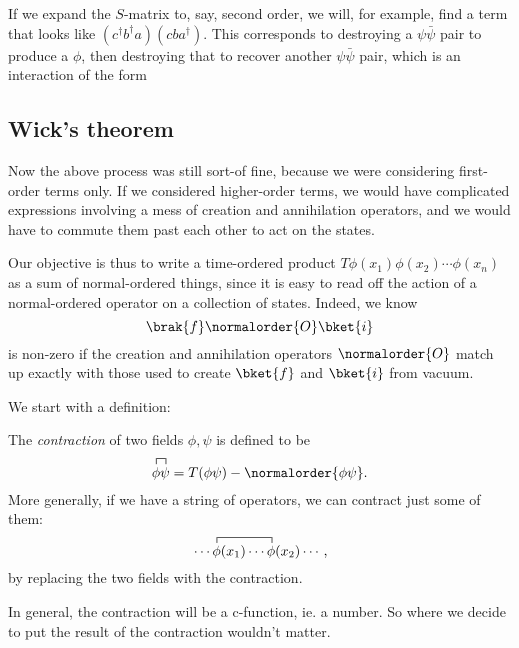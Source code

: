 \documentclass[a4paper]{article}
\begin{document}
If we expand the $S$-matrix to, say, second order, we will, for example, find a term that looks like $(c^\dagger b^\dagger a)(cba^\dagger)$. This corresponds to destroying a $\psi \bar{\psi}$ pair to produce a $\phi$, then destroying that to recover another $\psi \bar\psi$ pair, which is an interaction of the form
\begin{center}
\end{center}

\subsection{Wick's theorem}
Now the above process was still sort-of fine, because we were considering first-order terms only. If we considered higher-order terms, we would have complicated expressions involving a mess of creation and annihilation operators, and we would have to commute them past each other to act on the states.

Our objective is thus to write a time-ordered product $T \phi(x_1) \phi(x_2) \cdots \phi(x_n)$ as a sum of normal-ordered things, since it is easy to read off the action of a normal-ordered operator on a collection of states. Indeed, we know
\[
  \brak{f}\normalorder{O}\bket{i}
\]
is non-zero if the creation and annihilation operators $\normalorder{O}$ match up exactly with those used to create $\bket{f}$ and $\bket{i}$ from vacuum.

We start with a definition:
\begin{defi}[Contraction]
  The \emph{contraction} of two fields $\phi, \psi$ is defined to be
  \[
    \contraction{}{\phi}{}{\psi}\phi\psi = T(\phi\psi) - \normalorder{\phi\psi}.
  \]
  More generally, if we have a string of operators, we can contract just some of them:
  \[
    \contraction{\cdots}{\phi}{(x_1) \cdots}{\phi}\cdots\phi(x_1) \cdots \phi(x_2) \cdots,
  \]
  by replacing the two fields with the contraction.

  In general, the contraction will be a c-function, ie. a number. So where we decide to put the result of the contraction wouldn't matter.
\end{defi}
\end{document}
